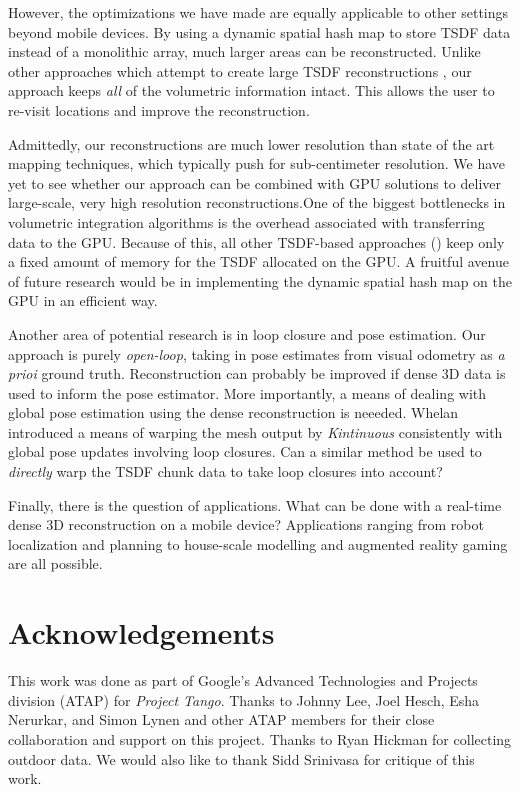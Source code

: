 \documentclass[10pt,twocolumn,letterpaper]{article}
\begin{document}
However, the optimizations we have made are equally applicable to other
settings beyond mobile devices. By using a dynamic spatial hash map to store
TSDF data instead of a monolithic array, much larger areas can be
reconstructed. Unlike other approaches which attempt to create large TSDF
reconstructions \cite{Whelan2013}, our approach keeps \textit{all} of the
volumetric information intact. This allows the user to re-visit locations and
improve the reconstruction.

Admittedly, our reconstructions are much lower resolution than state of the art
mapping techniques, which typically push for sub-centimeter resolution. We have
yet to see whether our approach can be combined with GPU solutions to deliver
large-scale, very high resolution reconstructions.One of the biggest
bottlenecks in volumetric integration algorithms is the overhead associated
with transferring data to the GPU. Because of this, all other TSDF-based
approaches (\cite{Newcombe, Whelan2013, Bylow2013, Nguyen2012}) keep only a
fixed amount of memory for the TSDF allocated on the GPU. A fruitful avenue of
future research would be in implementing the dynamic spatial hash map on the GPU
in an efficient way. 

Another area of potential research is in loop closure and pose estimation. Our
approach is purely \textit{open-loop}, taking in pose estimates from visual
odometry as \textit{a prioi} ground truth. Reconstruction can probably be
improved if dense 3D data is used to inform the pose estimator. More
importantly, a means of dealing with global pose estimation using the dense
reconstruction is neeeded. Whelan \etal\cite{WhelanLoopClose} introduced a
means of warping the mesh output by \textit{Kintinuous} consistently with global
pose updates involving loop closures. Can a similar method be used to
\textit{directly} warp the TSDF chunk data to take loop closures into account?

Finally, there is the question of applications. What can be done with a
real-time dense 3D reconstruction on a mobile device? Applications ranging from
robot localization and planning to house-scale modelling and augmented reality
gaming are all possible.

\ifcvprfinal
\section*{Acknowledgements}
This work was done as part of Google's Advanced Technologies and Projects
division (ATAP) for \emph{Project Tango}. Thanks to Johnny Lee, Joel Hesch, Esha
Nerurkar, and Simon Lynen and other ATAP members for their close collaboration
and support on this project. Thanks to Ryan Hickman for collecting outdoor data.
We would also like to thank Sidd Srinivasa for critique of this work.
\fi


 
\end{document}
